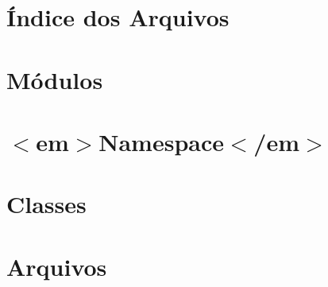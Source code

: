\documentclass[twoside]{book}
\newcommand{\+}{\discretionary{\mbox{\scriptsize$\hookleftarrow$}}{}{}}
\begin{document}
\chapter{Índice dos Arquivos}

\chapter{Módulos}


























\chapter{\texorpdfstring{$<$}{<}em\texorpdfstring{$>$}{>}Namespace\texorpdfstring{$<$}{<}/em\texorpdfstring{$>$}{>}}

\chapter{Classes}

















\chapter{Arquivos}






















\end{document}

